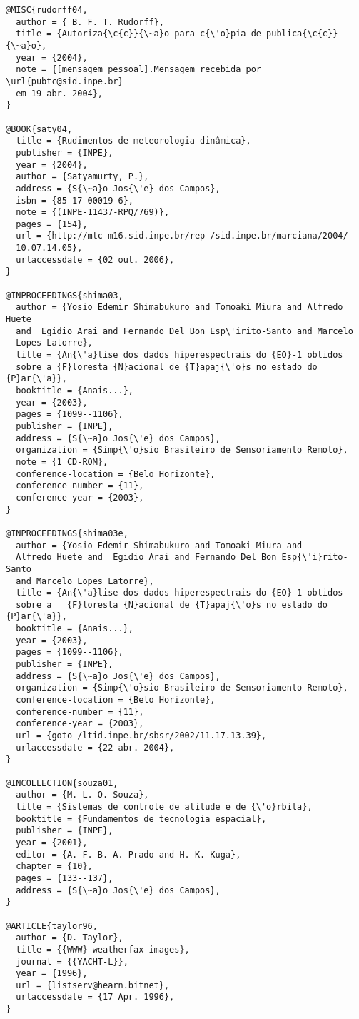 \begin{verbatim}
@MISC{rudorff04,
  author = { B. F. T. Rudorff},
  title = {Autoriza{\c{c}}{\~a}o para c{\'o}pia de publica{\c{c}}{\~a}o},
  year = {2004},
  note = {[mensagem pessoal].Mensagem recebida por \url{pubtc@sid.inpe.br} 
  em 19 abr. 2004},
}

@BOOK{saty04,
  title = {Rudimentos de meteorologia dinâmica},
  publisher = {INPE},
  year = {2004},
  author = {Satyamurty, P.},
  address = {S{\~a}o Jos{\'e} dos Campos},
  isbn = {85-17-00019-6},
  note = {(INPE-11437-RPQ/769)},
  pages = {154},
  url = {http://mtc-m16.sid.inpe.br/rep-/sid.inpe.br/marciana/2004/
  10.07.14.05},
  urlaccessdate = {02 out. 2006},
}

@INPROCEEDINGS{shima03,
  author = {Yosio Edemir Shimabukuro and Tomoaki Miura and Alfredo Huete 
  and  Egidio Arai and Fernando Del Bon Esp\'irito-Santo and Marcelo 
  Lopes Latorre},
  title = {An{\'a}lise dos dados hiperespectrais do {EO}-1 obtidos 
  sobre a {F}loresta {N}acional de {T}apaj{\'o}s no estado do {P}ar{\'a}},
  booktitle = {Anais...},
  year = {2003},
  pages = {1099--1106},
  publisher = {INPE},
  address = {S{\~a}o Jos{\'e} dos Campos},
  organization = {Simp{\'o}sio Brasileiro de Sensoriamento Remoto},
  note = {1 CD-ROM},
  conference-location = {Belo Horizonte},
  conference-number = {11},
  conference-year = {2003},
}

@INPROCEEDINGS{shima03e,
  author = {Yosio Edemir Shimabukuro and Tomoaki Miura and 
  Alfredo Huete and  Egidio Arai and Fernando Del Bon Esp{\'i}rito-Santo 
  and Marcelo Lopes Latorre},
  title = {An{\'a}lise dos dados hiperespectrais do {EO}-1 obtidos 
  sobre a   {F}loresta {N}acional de {T}apaj{\'o}s no estado do {P}ar{\'a}},
  booktitle = {Anais...},
  year = {2003},
  pages = {1099--1106},
  publisher = {INPE},
  address = {S{\~a}o Jos{\'e} dos Campos},
  organization = {Simp{\'o}sio Brasileiro de Sensoriamento Remoto},
  conference-location = {Belo Horizonte},
  conference-number = {11},
  conference-year = {2003},
  url = {goto-/ltid.inpe.br/sbsr/2002/11.17.13.39},
  urlaccessdate = {22 abr. 2004},
}

@INCOLLECTION{souza01,
  author = {M. L. O. Souza},
  title = {Sistemas de controle de atitude e de {\'o}rbita},
  booktitle = {Fundamentos de tecnologia espacial},
  publisher = {INPE},
  year = {2001},
  editor = {A. F. B. A. Prado and H. K. Kuga},
  chapter = {10},
  pages = {133--137},
  address = {S{\~a}o Jos{\'e} dos Campos},
}

@ARTICLE{taylor96,
  author = {D. Taylor},
  title = {{WWW} weatherfax images},
  journal = {{YACHT-L}},
  year = {1996},
  url = {listserv@hearn.bitnet},
  urlaccessdate = {17 Apr. 1996},
}


\end{verbatim}
